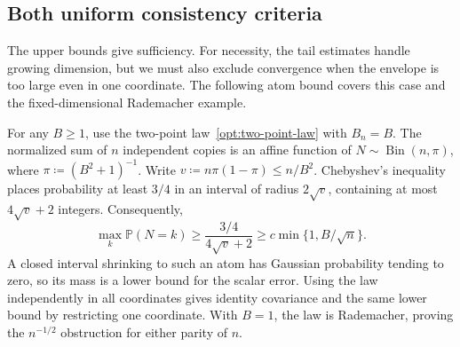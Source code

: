 \documentclass[11pt,letterpaper]{article}
\theoremstyle{remark}
\newcommand{\Pp}{\mathbb P}
\begin{document}
\subsection{Both uniform consistency criteria}
\label{app:consistency-proof}
The upper bounds give sufficiency. For necessity, the tail estimates
handle growing dimension, but we must also exclude convergence when
the envelope is too large even in one coordinate. The following atom
bound covers this case and the fixed-dimensional Rademacher example.

For any \(B\ge1\), use the two-point law~\eqref{opt:two-point-law}
with \(B_n=B\). The normalized sum of \(n\) independent copies is
an affine function of \(N\sim\operatorname{Bin}(n,\pi)\), where
\(\pi\coloneqq(B^2+1)^{-1}\). Write
\(v\coloneqq n\pi(1-\pi)\le n/B^2\). Chebyshev's inequality places
probability at least \(3/4\) in an interval of radius \(2\sqrt v\),
containing at most \(4\sqrt v+2\) integers. Consequently,
\begin{equation}
 \max_k\Pp(N=k)\ge\frac{3/4}{4\sqrt v+2}
       \ge c\min\{1,B/\sqrt n\}.
 \label{app:scalar-atom}
\end{equation}
A closed interval shrinking to such an atom has Gaussian probability
tending to zero, so its mass is a lower bound for the scalar error.
Using the law independently in all coordinates gives identity covariance
and the same lower bound by restricting one coordinate. With \(B=1\),
the law is Rademacher, proving the \(n^{-1/2}\) obstruction for either
parity of \(n\).
\end{document}
